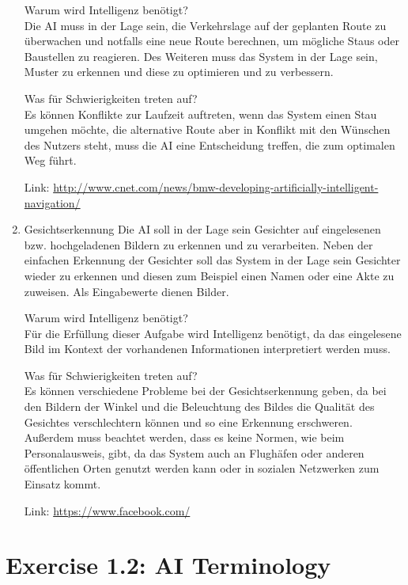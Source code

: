 \documentclass[a4paper]{scrartcl}
\begin{document}
\begin{enumerate}
      Warum wird Intelligenz benötigt? \\
      Die AI muss in der Lage sein, die Verkehrslage auf der geplanten Route zu
      überwachen und notfalls eine neue Route berechnen, um mögliche Staus oder
      Baustellen zu reagieren. Des Weiteren muss das System in der Lage sein,
      Muster zu erkennen und diese zu optimieren und zu verbessern.

      Was für Schwierigkeiten treten auf? \\
      Es können Konflikte zur Laufzeit auftreten, wenn das System einen Stau
      umgehen möchte, die alternative Route aber in Konflikt mit den Wünschen
      des Nutzers steht, muss die AI eine Entscheidung treffen, die zum
      optimalen Weg führt.

      Link: \url{http://www.cnet.com/news/bmw-developing-artificially-intelligent-navigation/}

    \item{Gesichtserkennung}
      Die AI soll in der Lage sein Gesichter auf eingelesenen bzw.
      hochgeladenen Bildern zu erkennen und zu verarbeiten. Neben der einfachen
      Erkennung der Gesichter soll das System in der Lage sein Gesichter wieder
      zu erkennen und diesen zum Beispiel einen Namen oder eine Akte zu
      zuweisen. Als Eingabewerte dienen Bilder.

      Warum wird Intelligenz benötigt? \\
      Für die Erfüllung dieser Aufgabe wird Intelligenz benötigt, da das
      eingelesene Bild im Kontext der vorhandenen Informationen interpretiert
      werden muss.

      Was für Schwierigkeiten treten auf? \\
      Es können verschiedene Probleme bei der Gesichtserkennung geben, da bei
      den Bildern der Winkel und die Beleuchtung des Bildes die Qualität des
      Gesichtes verschlechtern können und so eine Erkennung erschweren.
      Außerdem muss beachtet werden, dass es keine Normen, wie beim
      Personalausweis, gibt, da das System auch an Flughäfen oder anderen
      öffentlichen Orten genutzt werden kann oder in sozialen Netzwerken zum
      Einsatz kommt.

      Link: \url{https://www.facebook.com/}

\end{enumerate}


\section*{Exercise 1.2: AI Terminology}
\end{document}
